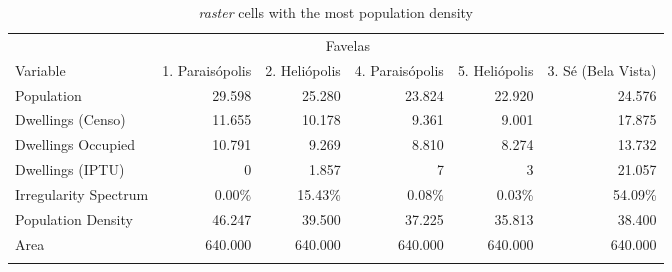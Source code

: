 \begin{table}[h]
\caption{\textit{raster} cells with the most population density}
\centering
\fontsize{9.8pt}{11.7pt}\selectfont
\begin{tabular*}{.975\linewidth}{@{\extracolsep{\fill}}lrrrrr}
\toprule
 & \multicolumn{4}{c}{Favelas} &  \\ 
\cmidrule(lr){2-5}
Variable & 1. Paraisópolis & 2. Heliópolis  & 4. Paraisópolis & 5. Heliópolis & 3. Sé (Bela Vista) \\ 
\midrule\addlinespace[2.5pt]
Population & 29.598 & 25.280 & 23.824 & 22.920 & 24.576 \\ 
Dwellings (Censo) & 11.655 & 10.178 & 9.361 & 9.001 & 17.875 \\ 
Dwellings Occupied & 10.791 & 9.269 & 8.810 & 8.274 & 13.732 \\ 
Dwellings (IPTU) & 0 & 1.857 & 7 & 3 & 21.057 \\ 
Irregularity Spectrum & 0.00\% & 15.43\% & 0.08\% & 0.03\% & 54.09\% \\ 
Population Density & 46.247 & 39.500 & 37.225 & 35.813 & 38.400 \\ 
Area & 640.000 & 640.000 & 640.000 & 640.000 & 640.000 \\ 
\bottomrule
\label{tab:top5}

\end{tabular*}
\end{table}

